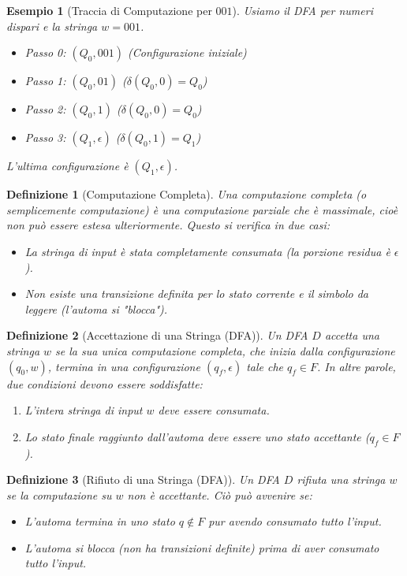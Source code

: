\documentclass[a4paper]{article}
\newtheorem{definition}{Definizione}[section]
\newtheorem{example}{Esempio}[section]
\begin{document}
\begin{example}[Traccia di Computazione per $001$]
Usiamo il DFA per numeri dispari e la stringa $w = 001$.
\begin{itemize}
    \item Passo 0: $(Q_0, 001)$ \quad (Configurazione iniziale)
    \item Passo 1: $(Q_0, 01)$ \quad ($\delta(Q_0, 0) = Q_0$)
    \item Passo 2: $(Q_0, 1)$ \quad ($\delta(Q_0, 0) = Q_0$)
    \item Passo 3: $(Q_1, \epsilon)$ \quad ($\delta(Q_0, 1) = Q_1$)
\end{itemize}
L'ultima configurazione è $(Q_1, \epsilon)$.
\end{example}

\begin{definition}[Computazione Completa]
Una \emph{computazione completa} (o semplicemente \emph{computazione}) è una computazione parziale che è massimale, cioè non può essere estesa ulteriormente. Questo si verifica in due casi:
\begin{itemize}
    \item La stringa di input è stata completamente consumata (la porzione residua è $\epsilon$).
    \item Non esiste una transizione definita per lo stato corrente e il simbolo da leggere (l'automa si "blocca").
\end{itemize}
\end{definition}

\begin{definition}[Accettazione di una Stringa (DFA)]
Un DFA $D$ \emph{accetta} una stringa $w$ se la sua unica computazione completa, che inizia dalla configurazione $(q_0, w)$, termina in una configurazione $(q_f, \epsilon)$ tale che $q_f \in F$.
In altre parole, due condizioni devono essere soddisfatte:
\begin{enumerate}
    \item L'intera stringa di input $w$ deve essere consumata.
    \item Lo stato finale raggiunto dall'automa deve essere uno stato accettante ($q_f \in F$).
\end{enumerate}
\end{definition}

\begin{definition}[Rifiuto di una Stringa (DFA)]
Un DFA $D$ \emph{rifiuta} una stringa $w$ se la computazione su $w$ non è accettante. Ciò può avvenire se:
\begin{itemize}
    \item L'automa termina in uno stato $q \notin F$ pur avendo consumato tutto l'input.
    \item L'automa si blocca (non ha transizioni definite) prima di aver consumato tutto l'input.
\end{itemize}
\end{definition}
\end{document}
